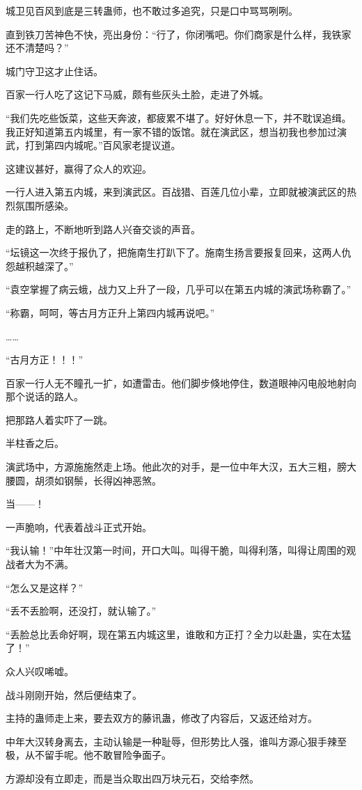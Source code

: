 \begin{this_body}
城卫见百风到底是三转蛊师，也不敢过多追究，只是口中骂骂咧咧。

直到铁刀苦神色不快，亮出身份：“行了，你闭嘴吧。你们商家是什么样，我铁家还不清楚吗？”

城门守卫这才止住话。

百家一行人吃了这记下马威，颇有些灰头土脸，走进了外城。

“我们先吃些饭菜，这些天奔波，都疲累不堪了。好好休息一下，并不耽误追缉。我正好知道第五内城里，有一家不错的饭馆。就在演武区，想当初我也参加过演武，打到第四内城呢。”百风家老提议道。

这建议甚好，赢得了众人的欢迎。

一行人进入第五内城，来到演武区。百战猎、百莲几位小辈，立即就被演武区的热烈氛围所感染。

走的路上，不断地听到路人兴奋交谈的声音。

“坛镜这一次终于报仇了，把施南生打趴下了。施南生扬言要报复回来，这两人仇怨越积越深了。”

“袁空掌握了病云蛾，战力又上升了一段，几乎可以在第五内城的演武场称霸了。”

“称霸，呵呵，等古月方正升上第四内城再说吧。”

……

“古月方正！！！”

百家一行人无不瞳孔一扩，如遭雷击。他们脚步倏地停住，数道眼神闪电般地射向那个说话的路人。

把那路人着实吓了一跳。

半柱香之后。

演武场中，方源施施然走上场。他此次的对手，是一位中年大汉，五大三粗，膀大腰圆，胡须如钢鬃，长得凶神恶煞。

当——！

一声脆响，代表着战斗正式开始。

“我认输！”中年壮汉第一时间，开口大叫。叫得干脆，叫得利落，叫得让周围的观战者大为不满。

“怎么又是这样？”

“丢不丢脸啊，还没打，就认输了。”

“丢脸总比丢命好啊，现在第五内城这里，谁敢和方正打？全力以赴蛊，实在太猛了！”

众人兴叹唏嘘。

战斗刚刚开始，然后便结束了。

主持的蛊师走上来，要去双方的藤讯蛊，修改了内容后，又返还给对方。

中年大汉转身离去，主动认输是一种耻辱，但形势比人强，谁叫方源心狠手辣至极，从不留手呢。他不敢冒险争面子。

方源却没有立即走，而是当众取出四万块元石，交给李然。


\end{this_body}
